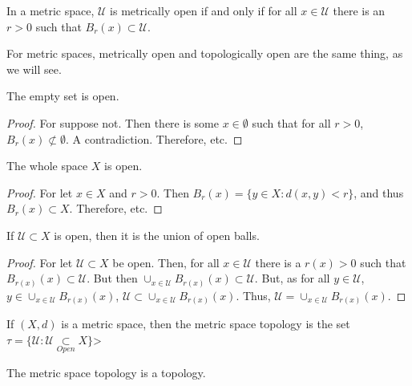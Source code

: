 \documentclass[crop=false,class=book,oneside]{standalone}
\begin{document}
            \begin{definition}
            In a metric space, $\mathcal{U}$ is metrically open if and only if for all $x\in \mathcal{U}$ there is an $r>0$ such that $B_{r}(x)\subset \mathcal{U}$.
            \end{definition}
            \begin{remark}
            For metric spaces, metrically open and topologically open are the same thing, as we will see.
            \end{remark} 
            \begin{theorem}
            The empty set is open.
            \end{theorem}
            \begin{proof}
            For suppose not. Then there is some $x\in \emptyset$ such that for all $r>0$, $B_{r}(x)\not\subset \emptyset$. A contradiction. Therefore, etc.
            \end{proof}
            \begin{theorem}
            The whole space $X$ is open.
            \end{theorem}
            \begin{proof}
            For let $x\in X$ and $r>0$. Then $B_{r}(x) = \{y\in X:d(x,y)<r\}$, and thus $B_{r}(x)\subset X$. Therefore, etc.
            \end{proof}
            \begin{theorem}
            If $\mathcal{U}\subset X$ is open, then it is the union of open balls.
            \end{theorem}
            \begin{proof}
            For let $\mathcal{U} \subset X$ be open. Then, for all $x\in \mathcal{U}$ there is a $r(x)>0$ such that $B_{r(x)}(x) \subset \mathcal{U}$. But then $\cup_{x\in \mathcal{U}}B_{r(x)}(x)\subset \mathcal{U}$. But, as for all $y\in \mathcal{U}$, $y\in \cup_{x\in \mathcal{U}}B_{r(x)}(x)$, $\mathcal{U} \subset \cup_{x\in \mathcal{U}}B_{r(x)}(x)$. Thus, $\mathcal{U}= \cup_{x\in \mathcal{U}}B_{r(x)}(x)$.
            \end{proof}
            \begin{definition}
            If $(X,d)$ is a metric space, then the metric space topology is the set $\tau = \{\mathcal{U}:\mathcal{U}\underset{Open}\subset X\}$>
            \end{definition}
            \begin{theorem}
            The metric space topology is a topology.
            \end{theorem}
\end{document}
